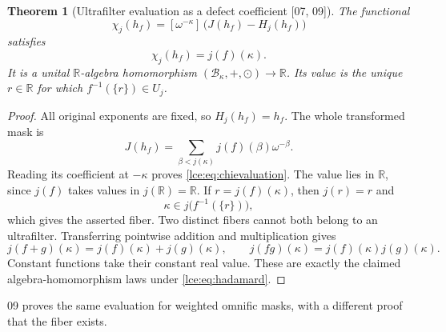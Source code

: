 \documentclass[11pt,letterpaper]{article}
\numberwithin{equation}{section}
\newtheorem{theorem}{Theorem}[section]
\theoremstyle{definition}
\theoremstyle{remark}
\newcommand{\R}{\mathbb R}
\newcommand{\coef}[2]{[\omega^{#1}]\,#2}
\newcommand{\src}[1]{\textup{\textsf{\small[#1]}}}%
\begin{document}
\begin{theorem}[Ultrafilter evaluation as a defect coefficient \src{07, 09}]\label{lce:thm:character}
The functional
\begin{equation}\label{lce:eq:chi}
 \chi_j(h_f)=\coef{-\kappa}{\bigl(J(h_f)-H_j(h_f)\bigr)}
\end{equation}
satisfies
\begin{equation}\label{lce:eq:chievaluation}
 \chi_j(h_f)=j(f)(\kappa).
\end{equation}
It is a unital $\R$-algebra homomorphism
$(\mathcal B_\kappa,+,\odot)\to\R$. Its value is the unique $r\in\R$
for which $f^{-1}(\{r\})\in U_j$.
\end{theorem}
\begin{proof}
All original exponents are fixed, so $H_j(h_f)=h_f$. The whole transformed
mask is
\[
 J(h_f)=\sum_{\beta<j(\kappa)}j(f)(\beta)\omega^{-\beta}.
\]
Reading its coefficient at $-\kappa$ proves
\eqref{lce:eq:chievaluation}. The value lies in $\R$, since $j(f)$ takes
values in $j(\R)=\R$. If $r=j(f)(\kappa)$, then $j(r)=r$ and
\[
 \kappa\in j\bigl(f^{-1}(\{r\})\bigr),
\]
which gives the asserted fiber. Two distinct fibers cannot both belong to
an ultrafilter. Transferring pointwise addition and multiplication gives
\[
 j(f+g)(\kappa)=j(f)(\kappa)+j(g)(\kappa),\qquad
 j(fg)(\kappa)=j(f)(\kappa)j(g)(\kappa).
\]
Constant functions take their constant real value. These are exactly the
claimed algebra-homomorphism laws under \eqref{lce:eq:hadamard}.
\end{proof}
09 proves the same evaluation for weighted omnific masks, with a different
proof that the fiber exists.
\end{document}
